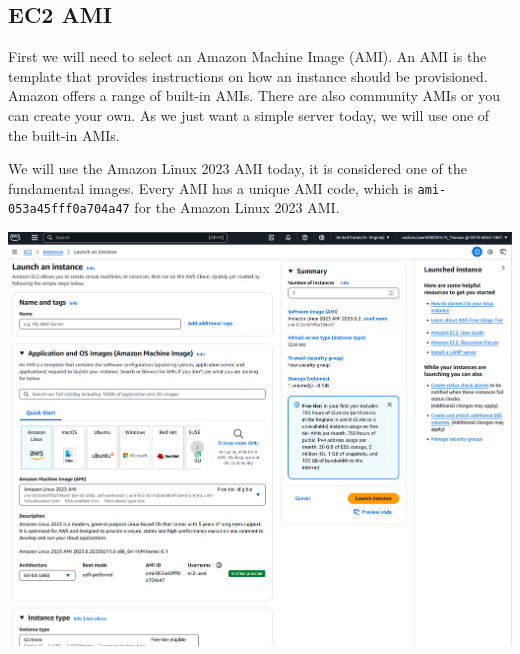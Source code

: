\documentclass{csse4400}
\begin{document}
\subsection{EC2 AMI}
First we will need to select an Amazon Machine Image (AMI).
An AMI is the template that provides instructions on how an instance should be provisioned.
Amazon offers a range of built-in AMIs. There are also community AMIs or you can create your own.
As we just want a simple server today, we will use one of the built-in AMIs.

We will use the Amazon Linux 2023 AMI today,
it is considered one of the fundamental images.
Every AMI has a unique AMI code,
which is \texttt{ami-053a45fff0a704a47} for the Amazon Linux 2023 AMI.

\vspace{3mm}
\noindent
\includegraphics[width=\textwidth]{images/launch-instance}

\end{document}
